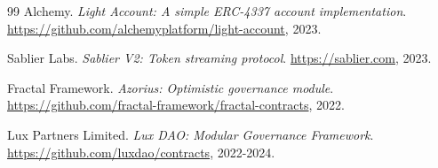 \documentclass[11pt,a4paper]{article}
\begin{document}
\begin{thebibliography}{99}
Alchemy.
\textit{Light Account: A simple ERC-4337 account implementation}.
\url{https://github.com/alchemyplatform/light-account}, 2023.

Sablier Labs.
\textit{Sablier V2: Token streaming protocol}.
\url{https://sablier.com}, 2023.

Fractal Framework.
\textit{Azorius: Optimistic governance module}.
\url{https://github.com/fractal-framework/fractal-contracts}, 2022.

Lux Partners Limited.
\textit{Lux DAO: Modular Governance Framework}.
\url{https://github.com/luxdao/contracts}, 2022-2024.

\end{thebibliography}
\end{document}
